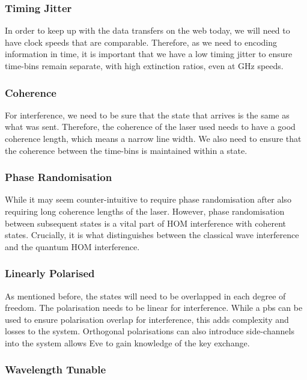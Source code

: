 \subsubsection*{Timing Jitter}

In order to keep up with the data transfers on the web today, we will need to have clock speeds that are comparable. Therefore, as we need to encoding information in time, it is important that we have a low timing jitter to ensure time-bins remain separate, with high extinction ratios, even at GHz speeds.

\subsubsection*{Coherence}

For interference, we need to be sure that the state that arrives is the same as what was sent. Therefore, the coherence of the laser used needs to have a good coherence length, which means a narrow line width. We also need to ensure that the coherence between the time-bins is maintained within a state.

\subsubsection*{Phase Randomisation}

While it may seem counter-intuitive to require phase randomisation after also requiring long coherence lengths of the laser. However, phase randomisation between subsequent states is a vital part of \ac{HOM} interference with coherent states. Crucially, it is what distinguishes between the classical wave interference and the quantum \ac{HOM} interference.

\subsubsection*{Linearly Polarised}

As mentioned before, the states will need to be overlapped in each degree of freedom. The polarisation needs to be linear for interference. While a \ac{pbs} can be used to ensure polarisation overlap for interference, this adds complexity and losses to the system. Orthogonal polarisations can also introduce side-channels into the system allows Eve to gain knowledge of the key exchange.

\subsubsection*{Wavelength Tunable}

